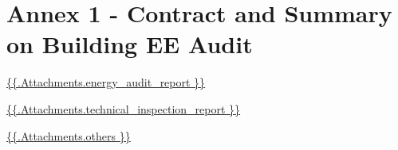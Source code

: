 \section{Annex 1 {-} Contract and Summary on Building EE Audit}

\url{ {{.Attachments.energy_audit_report }} }

\iffalse attachment value="energy audit report" \fi

\url{ {{.Attachments.technical_inspection_report }} }

\iffalse attachment value="technical inspection report" \fi


          \url{ {{.Attachments.others }} }
          \iffalse attachment value="others" \fi
